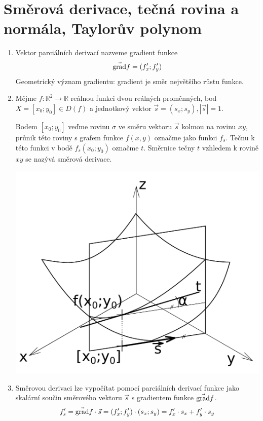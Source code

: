 \section{Směrová derivace, tečná rovina a normála, Taylorův polynom}
\begin{enumerate}

\item Vektor parciálních derivací nazveme gradient funkce
$$
\vec{\operatorname{grad}}f = (f^\prime_x; f^\prime_y)
$$
Geometrický význam gradientu: gradient je směr největšího růstu funkce.


\item Mějme $f:\mathbb{R}^2 \to \mathbb{R}$ reálnou funkci dvou reálných proměnných, bod $X = [x_0;y_0] \in D(f)$ a jednotkový vektor $\vec{s} = (s_x;s_y), |\vec{s}|=1$.

Bodem $[x_0;y_0]$ veďme rovinu $\sigma$ ve směru vektoru $\vec{s}$ kolmou na rovinu $xy$, průnik této roviny s grafem funkce $f(x,y)$ označme jako funkci $f_s$. Tečnu k této funkci v bodě $f_s(x_0;y_0)$ označme $t$. Směrnice tečny $t$ vzhledem k rovině $xy$ se nazývá směrová derivace.

\includegraphics[scale=0.5]{Obrazky/SmerDer.pdf}

\item Směrovou derivaci lze vypočítat pomocí parciálních derivací funkce jako skalární součin směrového vektoru $\vec{s}$ s gradientem funkce $\vec{\operatorname{grad}}f$. 
$$
f^\prime_s = \vec{\operatorname{grad}} f \cdot \vec{s} 
           = (f^\prime_x; f^\prime_y) \cdot (s_x;s_y)
           = f^\prime_x \cdot s_x + f^\prime_y \cdot s_y
$$


\end{enumerate}
